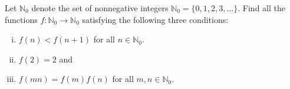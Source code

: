 \documentclass[varwidth]{standalone}
\begin{document}
    Let $\mathbb{N}_0$ denote the set of nonnegative integers $\mathbb{N}_0 = \{0, 1, 2, 3, \dots\}$. Find all the functions $f: \mathbb{N}_0 \to \mathbb{N}_0$ satisfying the following three conditions:

    \begin{enumerate}[(i)]
        \item $f(n) < f(n + 1)$ for all $n \in \mathbb{N}_0$.
        \item $f(2) = 2$ and
        \item $f(mn) = f(m)f(n)$ for all $m, n \in \mathbb{N}_0$.
    \end{enumerate}
\end{document}
